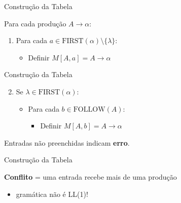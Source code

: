 \begin{frame}{Construção da Tabela}

    Para cada produção \(A \to \alpha\):

    \begin{enumerate}

        \item
        Para cada \(a \in \mathrm{FIRST}(\alpha) \setminus \{\lambda\}\):

        \begin{itemize}

            \item
            Definir \(M[A, a] = A \to \alpha\)
        \end{itemize}
    \end{enumerate}
\end{frame}

\begin{frame}{Construção da Tabela}

    \begin{enumerate}
        \setcounter{enumi}{1}

        \item
        Se \(\lambda \in \mathrm{FIRST}(\alpha)\):

        \begin{itemize}

            \item
            Para cada \(b \in \mathrm{FOLLOW}(A)\):

            \begin{itemize}

                \item
                Definir \(M[A, b] = A \to \alpha\)
            \end{itemize}
        \end{itemize}
    \end{enumerate}

    Entradas não preenchidas indicam \textbf{erro}.
\end{frame}

\begin{frame}{Construção da Tabela}

    \textbf{Conflito} = uma entrada recebe mais de uma produção

    \begin{itemize}

        \item
        gramática não é LL(1)!
    \end{itemize}
\end{frame}


